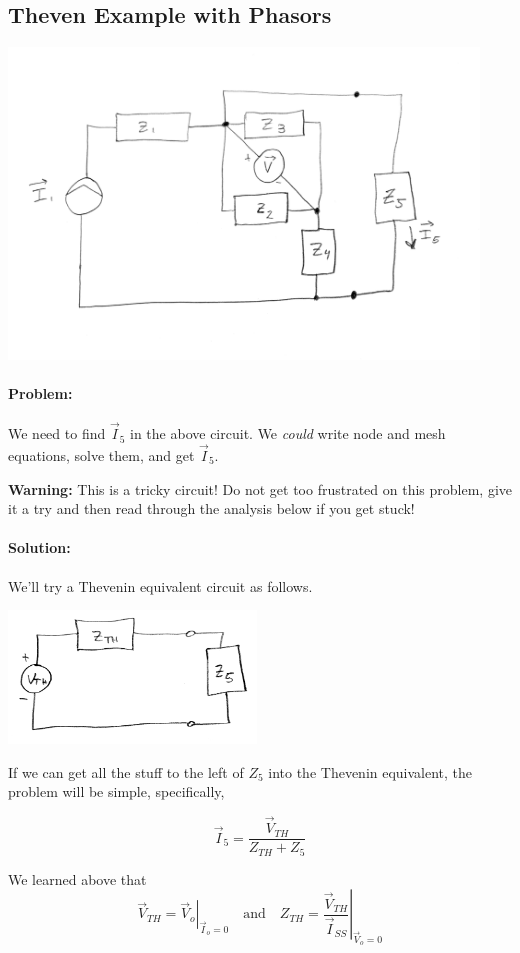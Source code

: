 \subsection{Theven  Example with Phasors}
\begin{Example}

\includegraphics[width=125mm]{figsChapt02/KS52020.png}

\paragraph{Problem:} We need to find $\vec I_5$ in the above circuit. We {\it could}
write node and mesh equations, solve them, and get $\vec I_5$.

{\bf Warning:}  This is a tricky circuit!
Do not get too frustrated on this problem, give it a try and then read through the analysis
below if you get stuck!


\paragraph{Solution:}
We'll try a
Thevenin  equivalent circuit as follows.


\includegraphics[width=66mm]{figsChapt02/DE22052.png}

If we can get all the stuff to the left of $Z_5$ into the Thevenin equivalent,
the problem will be simple, specifically,

\[
\vec I_5 = \frac {\vec V_{TH}}  {Z_{TH}+Z_5}
\]

We learned above that
\[
\vec{V}_{TH} = \left . \vec{V}_o \right |_{\vec{I}_o=0}
\quad
\text{and}
\quad
Z_{TH} = \left . \frac
        { \vec{V}_{TH}}
        { \vec{I}_{SS}}
        \right |_{\vec{V}_o=0  }
\]
\end{Example}
